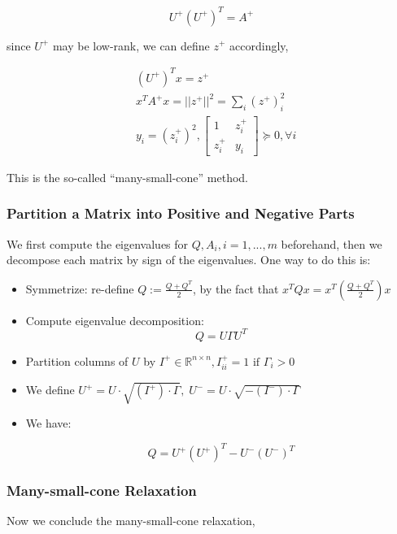 \documentclass[../main]{subfiles}
\begin{document}
\[U^+ (U^+)^T = A^+\]

since $U^+$ may be low-rank, we can define $z^+$ accordingly,

\begin{equation}
  \begin{aligned}
     & (U^+)^T x = z^+                                                  \\
     & x^TA^+ x = ||z^+||^2 = \sum_i (z^+)_i^2                          \\
     & y_i = (z^+_i)^2, \begin{bmatrix} 1 & z^+_i \\ z^+_i & y_i \end{bmatrix} \succeq 0, \forall i
  \end{aligned}
\end{equation}

This is the so-called ``many-small-cone'' method.


\subsubsection{Partition a Matrix into Positive and Negative Parts}
We first compute the eigenvalues for \(Q, A_i, i=1,...,m\) beforehand, then we decompose each matrix by sign of the eigenvalues.
One way to do this is:
\begin{itemize}

  \item Symmetrize: re-define \(Q := \frac{Q + Q^T}{2}\), by the fact that \(x^TQx = x^T(\frac{Q + Q^T}{2})x\)

  \item Compute eigenvalue decomposition:
        \[Q = U\Gamma U^T\]
  \item Partition columns of \(U\) by
        \(I^+ \in \mathbb{R}^{n\times n}, I^+_{ii} = 1 \textrm{  if  }\Gamma_i > 0\)

  \item We define \(U^+ = U\cdot \sqrt{(I^+)\cdot\Gamma},\; U^- = U \cdot\sqrt{-(I^-)\cdot\Gamma}\)
  \item We have:

        \[Q =  U^+ (U^+)^T - U^- (U^-)^T\]
\end{itemize}

\subsubsection{Many-small-cone Relaxation}

Now we conclude the many-small-cone relaxation,
\end{document}
